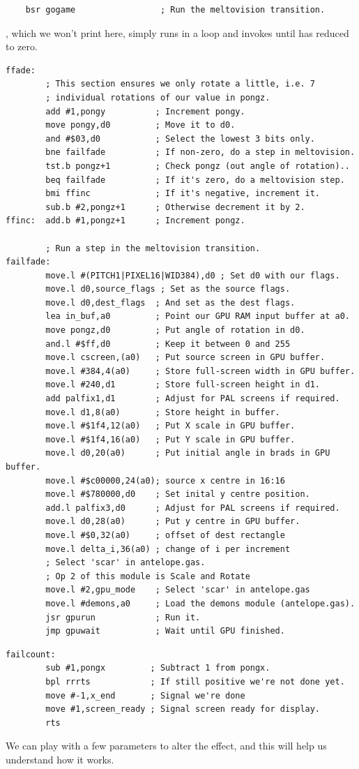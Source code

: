 \begin{lstlisting}
    bsr gogame                 ; Run the meltovision transition.
\end{lstlisting}
, which we won't print here, simply runs in a loop and invokes 
until  has reduced  to zero.
\clearpage
\begin{lstlisting}
ffade:
        ; This section ensures we only rotate a little, i.e. 7
        ; individual rotations of our value in pongz.
        add #1,pongy          ; Increment pongy.
        move pongy,d0         ; Move it to d0.
        and #$03,d0           ; Select the lowest 3 bits only.
        bne failfade          ; If non-zero, do a step in meltovision.
        tst.b pongz+1         ; Check pongz (out angle of rotation)..
        beq failfade          ; If it's zero, do a meltovision step.
        bmi ffinc             ; If it's negative, increment it.
        sub.b #2,pongz+1      ; Otherwise decrement it by 2.
ffinc:  add.b #1,pongz+1      ; Increment pongz.

        ; Run a step in the meltovision transition.
failfade:
        move.l #(PITCH1|PIXEL16|WID384),d0 ; Set d0 with our flags.
        move.l d0,source_flags ; Set as the source flags.
        move.l d0,dest_flags  ; And set as the dest flags.
        lea in_buf,a0         ; Point our GPU RAM input buffer at a0.
        move pongz,d0         ; Put angle of rotation in d0.
        and.l #$ff,d0         ; Keep it between 0 and 255
        move.l cscreen,(a0)   ; Put source screen in GPU buffer.
        move.l #384,4(a0)     ; Store full-screen width in GPU buffer.
        move.l #240,d1        ; Store full-screen height in d1.
        add palfix1,d1        ; Adjust for PAL screens if required.
        move.l d1,8(a0)       ; Store height in buffer.
        move.l #$1f4,12(a0)   ; Put X scale in GPU buffer.
        move.l #$1f4,16(a0)   ; Put Y scale in GPU buffer.
        move.l d0,20(a0)      ; Put initial angle in brads in GPU buffer.
        move.l #$c00000,24(a0); source x centre in 16:16
        move.l #$780000,d0    ; Set inital y centre position.
        add.l palfix3,d0      ; Adjust for PAL screens if required.
        move.l d0,28(a0)      ; Put y centre in GPU buffer.
        move.l #$0,32(a0)     ; offset of dest rectangle
        move.l delta_i,36(a0) ; change of i per increment
        ; Select 'scar' in antelope.gas.
        ; Op 2 of this module is Scale and Rotate
        move.l #2,gpu_mode    ; Select 'scar' in antelope.gas
        move.l #demons,a0     ; Load the demons module (antelope.gas).
        jsr gpurun            ; Run it.
        jmp gpuwait           ; Wait until GPU finished.
\end{lstlisting}
\begin{lstlisting}
failcount:
        sub #1,pongx         ; Subtract 1 from pongx.
        bpl rrrts            ; If still positive we're not done yet.
        move #-1,x_end       ; Signal we're done
        move #1,screen_ready ; Signal screen ready for display.
        rts
\end{lstlisting}
\clearpage
 We can play with a few parameters to alter the effect, and this will help us understand how it works.
 
